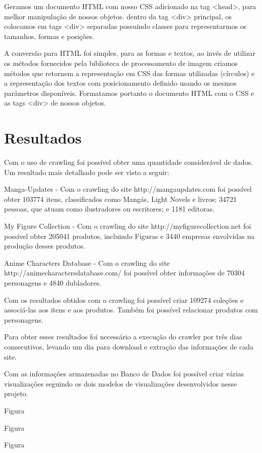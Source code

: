 \documentclass[12pt]{article}
\begin{document}
Geramos um documento HTML com nosso CSS adicionado na tag <head>, para melhor manipulação de nossos objetos. dentro da tag <div> principal, os colocamos em tags <div> separadas possuindo classes para representarmos os tamanhos, formas e posições.

A conversão para HTML foi simples, para as formas e textos, ao invés de utilizar os métodos fornecidos pela biblioteca de processamento de imagem criamos métodos que retornem a representação em CSS das formas utilizadas (círculos) e a representação dos textos com posicionamento definido usando os mesmos parâmetros disponíveis. 
Formatamos portanto o documento HTML com o CSS e as tags <div> de nossos objetos.


\section{Resultados}

Com o uso de crawling foi possível obter uma quantidade considerável de dados. Um resultado mais detalhado pode ser visto a seguir: 

Manga-Updates - Com o crawling do site http://mangaupdates.com foi possível obter 103774 itens, classificados como Mangás, Light Novels e livros; 34721 pessoas, que atuam como ilustradores ou escritores; e 1181 editoras.

My Figure Collection - Com o crawling do site http://myfigurecollection.net foi possível obter 205041 produtos, incluindo Figuras e 3440 empresas envolvidas na produção desses produtos.

Anime Characters Database - Com o crawling do site http://animecharactersdatabase.com/ foi possível obter informações de 70304 personagens e 4840 dubladores.

Com os resultados obtidos com o crawling foi possível criar 109274 coleções e associá-las aos itens e aos produtos. Também foi possível relacionar produtos com personagens.

Para obter esses resultados foi necessário a execução do crawler por três dias consecutivos, levando um dia para download e extração das informações de cada site.  

Com as informações armazenadas no Banco de Dados foi possível criar várias visualizações seguindo os dois modelos de visualizações desenvolvidos nesse projeto.




Figura


Figura


Figura
\end{document}
